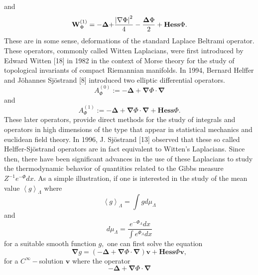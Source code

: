 \documentclass{article}
\begin{document}
and%
\begin{equation*}
\mathbf{W}_{\Phi }^{\left( 1\right) }=\mathbf{-\Delta +}\frac{\left| \mathbf{%
\nabla }\Phi \right| ^{2}}{4}-\frac{\mathbf{\Delta }\Phi }{2}+\mathbf{Hess}%
\Phi .
\end{equation*}%
These are in some sense, deformations of the standard Laplace Beltrami
operator. These operators, commonly called Witten Laplacians, were first
introduced by Edward Witten [18] in 1982 in the context of Morse theory for
the study of topological invariants of compact Riemannian manifolds. In
1994, Bernard Helffer and J\"{o}hannes Sj\"{o}strand [8] introduced two
elliptic differential operators.%
\begin{equation*}
A_{\Phi }^{(0)}:=-\mathbf{\Delta }+\mathbf{\nabla }\Phi \cdot \mathbf{\nabla 
}
\end{equation*}%
and 
\begin{equation*}
A_{\Phi }^{(1)}:=-\mathbf{\Delta }+\mathbf{\nabla }\Phi \cdot \mathbf{\nabla
+Hess}\Phi .
\end{equation*}%
These later operators, provide direct methods for the study of integrals and
operators in high dimensions of the type that appear in statistical
mechanics and euclidean field theory. In 1996, J. Sj\"{o}strand [13]
observed that these so called Helffer-Sj\"{o}strand operators are in fact
equivalent to Witten's Laplacians. Since then, there have been significant
advances in the use of these Laplacians to study the thermodynamic behavior
of quantities related to the Gibbs measure $Z^{-1}e^{-\Phi }dx.$ As a simple
illustration, if one is interested in the study of the mean value $%
\left\langle g\right\rangle _{\Lambda }$ where 
\begin{equation*}
\left\langle g\right\rangle _{\Lambda }=\int gd\mu _{\Lambda }
\end{equation*}%
and 
\begin{equation*}
d\mu _{\Lambda }=\frac{e^{-\Phi _{\Lambda }}dx}{\int e^{\Phi _{\Lambda }}dx}
\end{equation*}%
for a suitable smooth function $g,$ one can first solve the equation%
\begin{equation*}
\mathbf{\nabla }g=\left( -\mathbf{\Delta }+\mathbf{\nabla }\Phi \cdot 
\mathbf{\nabla }\right) \mathbf{v+Hess}\Phi \mathbf{v,}
\end{equation*}%
for a $C^{\infty }-$solution $\mathbf{v}$ where the operator 
\begin{equation*}
-\mathbf{\Delta }+\mathbf{\nabla }\Phi \cdot \mathbf{\nabla }
\end{equation*}%
\end{document}
